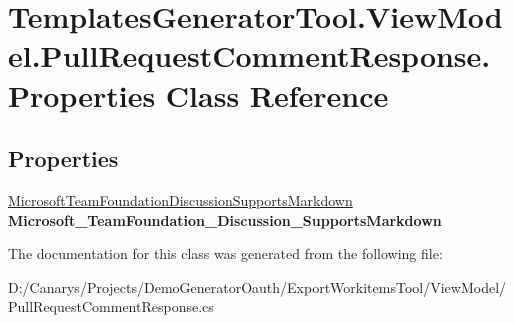 \hypertarget{class_templates_generator_tool_1_1_view_model_1_1_pull_request_comment_response_1_1_properties}{}\section{Templates\+Generator\+Tool.\+View\+Model.\+Pull\+Request\+Comment\+Response.\+Properties Class Reference}
\label{class_templates_generator_tool_1_1_view_model_1_1_pull_request_comment_response_1_1_properties}
\subsection*{Properties}
\begin{DoxyCompactItemize}
\item 
\mbox{\label{class_templates_generator_tool_1_1_view_model_1_1_pull_request_comment_response_1_1_properties_a93db80f4ad65c5155dd4ba326cef23ef}} 
\mbox{\hyperlink{class_templates_generator_tool_1_1_view_model_1_1_pull_request_comment_response_1_1_microsoft_te033d878f4bc391c4991265602b9d9ecf}{Microsoft\+Team\+Foundation\+Discussion\+Supports\+Markdown}} {\bfseries Microsoft\+\_\+\+Team\+Foundation\+\_\+\+Discussion\+\_\+\+Supports\+Markdown}
\end{DoxyCompactItemize}


The documentation for this class was generated from the following file\+:\begin{DoxyCompactItemize}
\item 
D\+:/\+Canarys/\+Projects/\+Demo\+Generator\+Oauth/\+Export\+Workitems\+Tool/\+View\+Model/Pull\+Request\+Comment\+Response.\+cs\end{DoxyCompactItemize}
